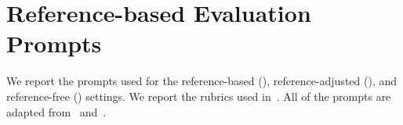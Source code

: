 


\section{Reference-based Evaluation Prompts}\label{sec:6-appendix-prompts}
We report the prompts used for the reference-based (), reference-adjusted (), and reference-free () settings. We report the rubrics used in~. All of the prompts are adapted from~\textcite{Kim2023Prometheus} and~\textcite{fabbri-etal-2021-summeval}.



